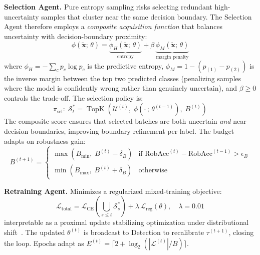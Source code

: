 \documentclass[review,1p,times,number]{elsarticle}
\begin{document}
\textbf{Selection Agent.}
Pure entropy sampling risks selecting redundant high-uncertainty
samples that cluster near the same decision boundary. The Selection
Agent therefore employs a \textit{composite acquisition function} that
balances uncertainty with decision-boundary proximity:
\begin{equation}
\phi(\tilde{\mathbf{x}};\,\theta) =
  \underbrace{\phi_H(\tilde{\mathbf{x}};\,\theta)}_{\text{entropy}}
  + \beta\,
  \underbrace{\phi_M(\tilde{\mathbf{x}};\,\theta)}_{\text{margin
  penalty}}
\label{eq:composite_acq}
\end{equation}
where $\phi_H = -\sum_c p_c \log p_c$ is the predictive entropy,
$\phi_M = 1 - (p_{(1)} - p_{(2)})$ is the inverse margin between the
top two predicted classes (penalizing samples where the model is
confidently wrong rather than genuinely uncertain), and
$\beta \geq 0$ controls the trade-off. The selection policy is:
\begin{equation}
\pi_{\mathrm{sel}}:\;\mathcal{S}_t^* =
\operatorname{TopK}\!\left(\mathcal{U}^{(t)},\;
\phi(\cdot\,;\,\theta^{(t-1)}),\; B^{(t)}\right)
\label{eq:sel_policy}
\end{equation}
The composite score ensures that selected batches are both uncertain
\textit{and} near decision boundaries, improving boundary refinement
per label. The budget adapts on robustness gain:
\begin{equation}
B^{(t+1)} =
\begin{cases}
  \max(B_{\min},\; B^{(t)} - \delta_B)
    & \text{if } \mathrm{RobAcc}^{(t)} - \mathrm{RobAcc}^{(t-1)}
      > \epsilon_B \\
  \min(B_{\max},\; B^{(t)} + \delta_B)
    & \text{otherwise}
\end{cases}
\label{eq:budget_adapt}
\end{equation}

\textbf{Retraining Agent.}
Minimizes a regularized mixed-training objective:
\begin{equation}
\mathcal{L}_{\mathrm{total}} =
\mathcal{L}_{\mathrm{CE}}\!\left(\bigcup_{s \leq t}\mathcal{S}_s^*
\right) + \lambda\,\mathcal{L}_{\mathrm{reg}}(\theta),
\quad \lambda = 0.01
\label{eq:loss}
\end{equation}
interpretable as a proximal update stabilizing optimization under
distributional shift~\cite{kirkpatrick2017overcoming}. The updated
$\theta^{(t)}$ is broadcast to Detection to recalibrate
$\tau^{(t+1)}$, closing the loop. Epochs adapt as
$E^{(t)} = \lceil 2 + \log_2(|\mathcal{L}^{(t)}|/B)\rceil$.
\end{document}

